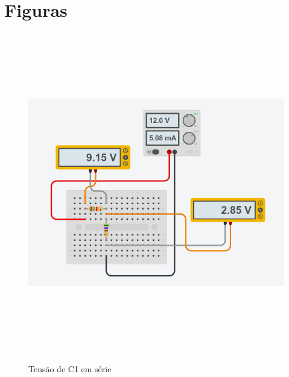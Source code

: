 \documentclass[
		12pt, %
		oneside, %
		a4paper, %
		article, %
		chapter=TITLE, %
		section=TITLE, %
		subsection=TITLE, %
		english, %
		spanish, %
		brazil %
]{abntex2} %
\numberwithin{equation}{section}
\numberwithin{figure}{section}
\numberwithin{table}{section}
\begin{document}
	\chapter{Figuras}
	\begin{figure}[h]
		\graphicspath{ {./esquematicos/} }

		\caption{Tensão de C1 em série}
		\includegraphics[width=15cm, height=14cm]{C1_S-T.png}
		\label{fig:figura1}

	\end{figure}
\end{document}
